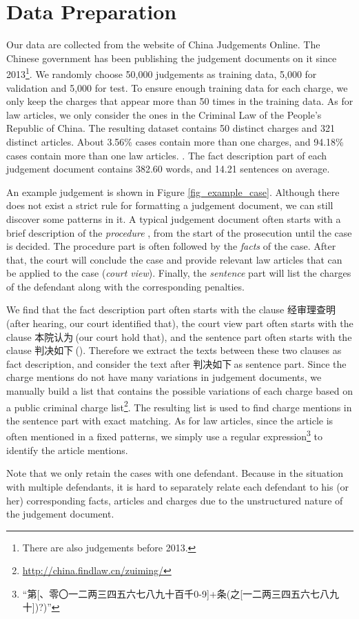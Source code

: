\section{Data Preparation} 
Our data are collected from the website of China Judgements Online. The Chinese government has been publishing the judgement documents on it since 2013\footnote{There are also judgements before 2013.}. We randomly choose 50,000 judgements as training data, 5,000 for validation and 5,000 for test. To ensure enough training data for each charge, we only keep the charges that appear more than 50 times in the training data. As for law articles, we only consider the ones in the Criminal Law of the People's Republic of China. The resulting dataset contains 50 distinct charges and 321 distinct articles. About 3.56\% cases contain more than one charges, and 94.18\% cases contain more than one law articles. . The fact description part of each judgement document contains 382.60 words, and 14.21 sentences on average.

An example judgement is shown in Figure \ref{fig_example_case}. Although there does not exist a strict rule for formatting a judgement document, we can still discover some patterns in it. A typical judgement document often starts with a brief description of the \emph{procedure} , from the start of the prosecution until the case is decided. The procedure part is often followed by the \emph{facts} of the case. After that, the court will conclude the case and provide relevant law articles that can be applied to the case (\emph{court view}). Finally, the \emph{sentence} part will list the charges of the defendant along with the corresponding penalties. 

We find that the fact description part often starts with the clause 经审理查明$\ $(after hearing, our court identified that), the court view part often starts with the clause 本院认为$\ $(our court hold that), and the sentence part often starts with the clause 判决如下$\ $(). Therefore we extract the texts between these two clauses as fact description, and consider the text after 判决如下$\ $as sentence part. Since the charge mentions do not have many variations in judgement documents, we manually build a list that contains the possible variations of each charge based on a public criminal charge list\footnote{\url{http://china.findlaw.cn/zuiming/}}. The resulting list is used to find charge mentions in the sentence part with exact matching. As for law articles, since the article is often mentioned in a fixed patterns, we simply use a regular expression\footnote{``第[、零〇一二两三四五六七八九十百千0-9]+条(之[一二两三四五六七八九十])?)''} to identify the article mentions. 

Note that we only retain the cases with one defendant. Because in the situation with multiple defendants, it is hard to separately relate each defendant to his (or her) corresponding facts, articles and charges due to the unstructured nature of the judgement document.